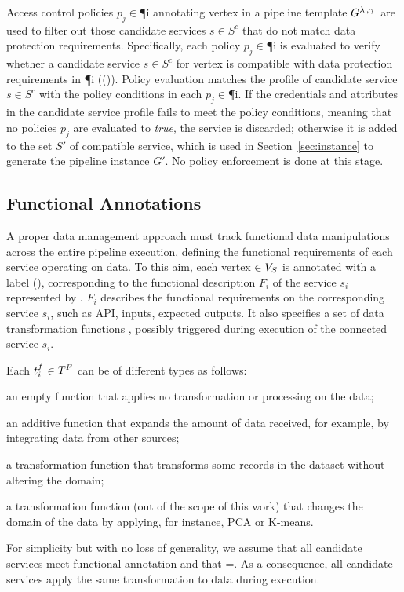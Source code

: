       Access control policies $p_j$$\in$\P{i} annotating vertex  in a pipeline template $G^{\lambda\,,\gamma\,}$ are used to filter out those candidate services $s$$\in$$S^c$ that do not match data protection requirements. Specifically, each policy $p_j$$\in$\P{i} is evaluated to verify whether a candidate service $s$$\in$$S^c$ for vertex  is compatible with data protection requirements in \P{i} (\myLambda()). Policy evaluation matches the profile of candidate service $s$$\in$$S^c$ with the policy conditions in each $p_j$$\in$\P{i}. If the credentials and attributes in the candidate service profile fails to meet the policy conditions, meaning that no policies $p_j$ are evaluated to \emph{true}, the service is discarded; otherwise it is added to the set $S'$ of compatible service, which is used in Section~\ref{sec:instance} to generate the pipeline instance $G'$. No policy enforcement is done at this stage.

    \subsection{Functional Annotations}\label{sec:funcannotation}
    A proper data management approach must track functional data manipulations across the entire pipeline execution, defining the functional requirements of each service operating on data.
    To this aim, each vertex $\in V_S$ is annotated with a label \myGamma(), corresponding to the functional description $F_i$ of the service $s_i$ represented by .
  $F_i$ describes the functional requirements on the corresponding service $s_i$, such as API, inputs, expected outputs.
    It also specifies a set \TF{} of data transformation functions , possibly triggered during execution of the connected service $s_i$.

    Each $t^f_{i}$$\in$$T^F_{}$ can be of different types as follows:
\begin{enumerate*}[label=\roman*)]
  \item an empty function \tf{\epsilon} that applies no transformation or processing on the data;
  \item an additive function  that expands the amount of data received, for example, by integrating data from other sources;
  \item a transformation function  that transforms some records in the dataset without altering the domain;
  \item a transformation function  (out of the scope of this work) that changes the domain of the data by applying, for instance, PCA or K-means.
\end{enumerate*}

For simplicity but with no loss of generality, we assume that all candidate services meet functional annotation \F{} and that \TF{}=\tf{}. As a consequence, all candidate services apply the same transformation to data during execution.

